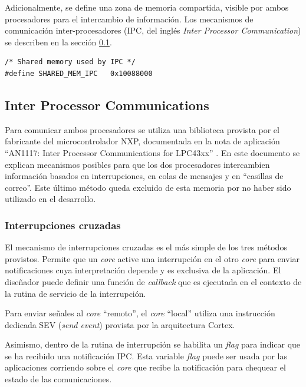 Adicionalmente, se define una zona de memoria compartida, visible por ambos procesadores para el intercambio de información. Los mecanismos de comunicación inter-procesadores (IPC, del inglés \textit{Inter Processor Communication}) se describen en la sección \ref{subsec:IPC}. 

\begin{verbatim}
/* Shared memory used by IPC */
#define SHARED_MEM_IPC   0x10088000	 
\end{verbatim}

\subsection{Inter Processor Communications}
\label{subsec:IPC}

Para comunicar ambos procesadores se utiliza una biblioteca provista por el fabricante del microcontrolador NXP, documentada en la nota de aplicación ``AN1117: Inter Processor Communications for LPC43xx'' \citep{nxp:an1117}. En este documento se explican mecanismos posibles para que los dos procesadores intercambien información basados en interrupciones, en colas de mensajes y en ``casillas de correo''.  Este último método queda excluido de esta memoria por no haber sido utilizado en el desarrollo.

\subsubsection{Interrupciones cruzadas}
\label{subsubsec:interrupcion}

El mecanismo de interrupciones cruzadas es el más simple de los tres métodos provistos.  Permite que un \textit{core} active una interrupción en el otro \textit{core} para enviar notificaciones cuya interpretación depende y es exclusiva de la aplicación.  El diseñador puede definir una función de \textit{callback} que es ejecutada en el contexto de la rutina de servicio de la interrupción.  

Para enviar señales al \textit{core} ``remoto'', el \textit{core} ``local'' utiliza una instrucción dedicada SEV (\textit{send event}) provista por la arquitectura Cortex.

Asimismo, dentro de la rutina de interrupción se habilita un \textit{flag} para indicar que se ha recibido una notificación IPC.  Esta variable \textit{flag} puede ser usada por las aplicaciones corriendo sobre el \textit{core} que recibe la notificación para chequear el estado de las comunicaciones. 

